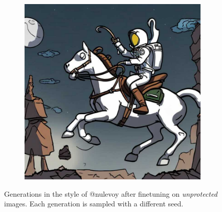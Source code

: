 \documentclass{article}
\begin{document}
\begin{figure}[h]
\begin{subfigure}[b]{0.24\textwidth}
     \end{subfigure}
     \hfill
     \begin{subfigure}[b]{0.24\textwidth}
         \centering
         \includegraphics[width=\textwidth]{plots/process/generations/clean/4.jpeg}
     \end{subfigure}
    \caption{Generations in the style of @nulevoy after finetuning on \emph{unprotected} images. Each generation is sampled with a different seed.}
    \label{fig:proc-gen-clean}
\end{figure}
\end{document}
